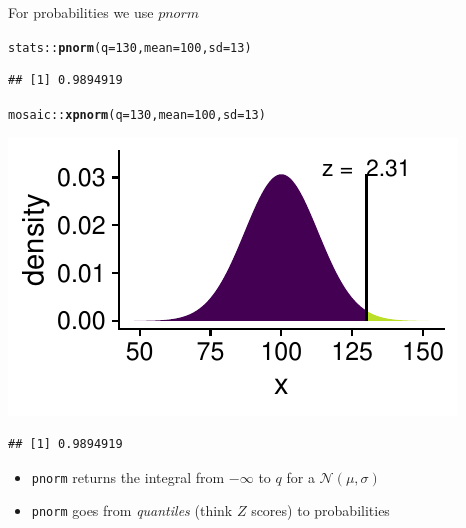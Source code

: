 \documentclass[10pt]{beamer}\usepackage[]{graphicx}\usepackage[]{color}
\makeatletter
\newcommand{\hlnum}[1]{\textcolor[rgb]{0.686,0.059,0.569}{#1}}%
\newcommand{\hlopt}[1]{\textcolor[rgb]{0,0,0}{#1}}%
\newcommand{\hlstd}[1]{\textcolor[rgb]{0.345,0.345,0.345}{#1}}%
\newcommand{\hlkwc}[1]{\textcolor[rgb]{0.333,0.667,0.333}{#1}}%
\newcommand{\hlkwd}[1]{\textcolor[rgb]{0.737,0.353,0.396}{\textbf{#1}}}%
\newenvironment{kframe}{%
 \def\at@end@of@kframe{}%
 \ifinner\ifhmode%
  \def\at@end@of@kframe{\end{minipage}}%
  \begin{minipage}{\columnwidth}%
 \fi\fi%
 \def\FrameCommand##1{\hskip\@totalleftmargin \hskip-\fboxsep
 \colorbox{shadecolor}{##1}\hskip-\fboxsep
     \hskip-\linewidth \hskip-\@totalleftmargin \hskip\columnwidth}%
 \MakeFramed {\advance\hsize-\width
   \@totalleftmargin\z@ \linewidth\hsize
   \@setminipage}}%
 {\par\unskip\endMakeFramed%
 \at@end@of@kframe}
\newenvironment{knitrout}{}{} %
\makeatother
\begin{document}
\begin{frame}[fragile]{For probabilities we use $pnorm$}
	
	
\begin{knitrout}\tiny
{}\color{fgcolor}\begin{kframe}
\begin{alltt}
\hlstd{stats}\hlopt{::}\hlkwd{pnorm}\hlstd{(}\hlkwc{q} \hlstd{=} \hlnum{130}\hlstd{,} \hlkwc{mean} \hlstd{=} \hlnum{100}\hlstd{,} \hlkwc{sd} \hlstd{=} \hlnum{13}\hlstd{)}
\end{alltt}
\begin{verbatim}
## [1] 0.9894919
\end{verbatim}
\end{kframe}
\end{knitrout}
	
	\pause 
	
\begin{knitrout}\tiny
{}\color{fgcolor}\begin{kframe}
\begin{alltt}
\hlstd{mosaic}\hlopt{::}\hlkwd{xpnorm}\hlstd{(}\hlkwc{q} \hlstd{=} \hlnum{130}\hlstd{,} \hlkwc{mean} \hlstd{=} \hlnum{100}\hlstd{,} \hlkwc{sd} \hlstd{=} \hlnum{13}\hlstd{)}
\end{alltt}
\end{kframe}

{\centering \includegraphics[width=0.6\linewidth]{figure/probs3-1} 

}


\begin{kframe}\begin{verbatim}
## [1] 0.9894919
\end{verbatim}
\end{kframe}
\end{knitrout}
	
	\pause 
	
	\begin{itemize}
		\item \texttt{pnorm} returns the integral from $-\infty$ to $q$ for a $\mathcal{N}(\mu, \sigma)$
		\item \texttt{pnorm} goes from \textit{quantiles} (think $Z$ scores) to probabilities
	\end{itemize}
	
\end{frame}
\end{document}
